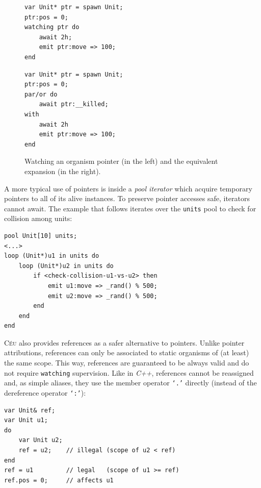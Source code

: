 \documentclass{sigplanconf}
\newcommand{\CEU}{\textsc{C\'{e}u}\xspace}
\newcommand{\code}[1] {{\small{\texttt{#1}}}}
\newcommand{\1}{\;}
\newcommand{\2}{\;\;}
\newcommand{\3}{\;\;\;}
\newcommand{\5}{\;\;\;\;\;}
\begin{document}
\begin{figure}%
\begin{minipage}[t]{0.48\linewidth}
\begin{lstlisting}
var Unit* ptr = spawn Unit;
ptr:pos = 0;
watching ptr do
    await 2h;
    emit ptr:move => 100;
end
\end{lstlisting}
\end{minipage}
%
\begin{minipage}[t]{0.48\linewidth}
\begin{lstlisting}
var Unit* ptr = spawn Unit;
ptr:pos = 0;
par/or do
    await ptr:__killed;
with
    await 2h
    emit ptr:move => 100;
end
\end{lstlisting}
\end{minipage}
\caption{ Watching an organism pointer (in the left) and the equivalent 
expansion (in the right).
\label{lst.watching}
}
\end{figure}

A more typical use of pointers is inside a \emph{pool iterator} which acquire 
temporary pointers to all of its alive instances.
To preserve pointer accesses safe, iterators cannot await.
The example that follows iterates over the \code{units} pool to check for 
collision among units:


\begin{lstlisting}
pool Unit[10] units;
<...>
loop (Unit*)u1 in units do
    loop (Unit*)u2 in units do
        if <check-collision-u1-vs-u2> then
            emit u1:move => _rand() % 500;
            emit u2:move => _rand() % 500;
        end
    end
end
\end{lstlisting}

\CEU also provides references as a safer alternative to pointers.
Unlike pointer attributions, references can only be associated to static 
organisms of (at least) the same scope.
This way, references are guaranteed to be always valid and do not require
\code{watching} supervision.
Like in \emph{C++}, references cannot be reassigned and, as simple aliases, 
they use the member operator \code{`.'} directly (instead of the dereference 
operator \code{`:'}):

\begin{lstlisting}
var Unit& ref;
var Unit u1;
do
    var Unit u2;
    ref = u2;    // illegal (scope of u2 < ref)
end
ref = u1         // legal   (scope of u1 >= ref)
ref.pos = 0;     // affects u1
\end{lstlisting}
\end{document}

